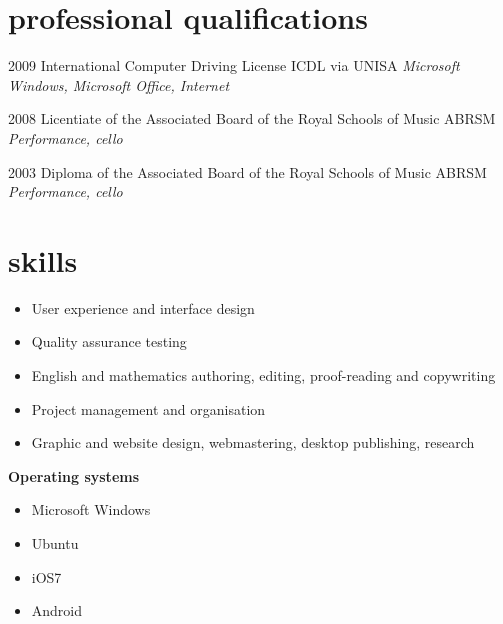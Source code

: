 \documentclass[]{friggeri-cv} %
\begin{document}

\section{professional qualifications}

\begin{entrylist}
\entry
{2009}
{International Computer Driving License}
{ICDL via UNISA}
{\emph{Microsoft Windows, Microsoft Office, Internet}}

\entry
{2008}
{Licentiate of the Associated Board of the Royal Schools of Music}
{ABRSM}
{\emph{Performance, cello}}

\entry
{2003}
{Diploma of the Associated Board of the Royal Schools of Music}
{ABRSM}
{\emph{Performance, cello}}

\end{entrylist}


\section{skills}

\begin{itemize}
\item User experience and interface design
\item Quality assurance testing
\item English and mathematics authoring, editing, proof-reading and copywriting
\item Project management and organisation
\item Graphic and website design, webmastering, desktop publishing, research
\end{itemize}

\textbf{Operating systems}
\begin{multicols}{2}
\begin{itemize}
 \item Microsoft Windows
 \item Ubuntu
 \item iOS7
 \item Android
\end{itemize}
\end{multicols}
\end{document}
